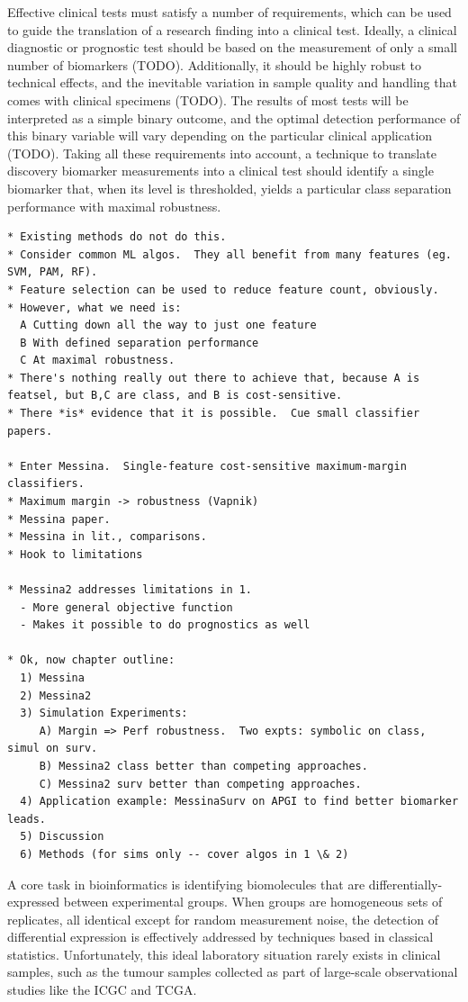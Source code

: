\documentclass[dissertation.tex]{subfiles}
\begin{document}
Effective clinical tests must satisfy a number of requirements, which can be used to guide the translation of a research finding into a clinical test.  Ideally, a clinical diagnostic or prognostic test should be based on the measurement of only a small number of biomarkers (TODO).  Additionally, it should be highly robust to technical effects, and the inevitable variation in sample quality and handling that comes with clinical specimens (TODO).  The results of most tests will be interpreted as a simple binary outcome, and the optimal detection performance of this binary variable will vary depending on the particular clinical application (TODO).  Taking all these requirements into account, a technique to translate discovery biomarker measurements into a clinical test should identify a single biomarker that, when its level is thresholded, yields a particular class separation performance with maximal robustness.

\begin{verbatim}
* Existing methods do not do this.
* Consider common ML algos.  They all benefit from many features (eg. SVM, PAM, RF).
* Feature selection can be used to reduce feature count, obviously.
* However, what we need is:
  A Cutting down all the way to just one feature
  B With defined separation performance
  C At maximal robustness.
* There's nothing really out there to achieve that, because A is featsel, but B,C are class, and B is cost-sensitive.
* There *is* evidence that it is possible.  Cue small classifier papers.

* Enter Messina.  Single-feature cost-sensitive maximum-margin classifiers.
* Maximum margin -> robustness (Vapnik)
* Messina paper.
* Messina in lit., comparisons.
* Hook to limitations

* Messina2 addresses limitations in 1.
  - More general objective function
  - Makes it possible to do prognostics as well

* Ok, now chapter outline:
  1) Messina
  2) Messina2
  3) Simulation Experiments:
     A) Margin => Perf robustness.  Two expts: symbolic on class, simul on surv.
     B) Messina2 class better than competing approaches.
     C) Messina2 surv better than competing approaches.
  4) Application example: MessinaSurv on APGI to find better biomarker leads.
  5) Discussion
  6) Methods (for sims only -- cover algos in 1 \& 2)
\end{verbatim}


A core task in bioinformatics is identifying biomolecules that are differentially-expressed between experimental groups. When groups are homogeneous sets of replicates, all identical except for random measurement noise, the detection of differential expression is effectively addressed by techniques based in classical statistics.  Unfortunately, this ideal laboratory situation rarely exists in clinical samples, such as the tumour samples collected as part of large-scale observational studies like the ICGC and TCGA.
\end{document}
